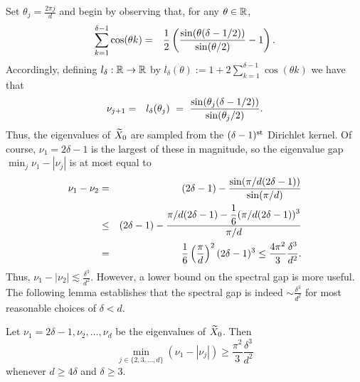 Set $\theta_j = \frac{2 \pi j}{d}$ and begin by observing that, for any $\theta \in \mathbb{R}$,
\begin{eqnarray*}
  \sum_{k = 1}^{\delta - 1}\cos(\theta k) %
  & = & \bigfrac{1}{2}\left(\bigfrac{\sin(\theta(\delta - 1/2))}{\sin(\theta / 2)} - 1\right).
\end{eqnarray*}
Accordingly, defining $l_\delta : \mathbb{R} \to \mathbb{R}$ by $l_\delta(\theta) := 1 + 2\sum_{k=1}^{\delta - 1} \cos(\theta k)$ we have that
\begin{eqnarray}
  \nu_{j+1} %
  & = & l_\delta(\theta_j) ~=~ \bigfrac{\sin(\theta_j(\delta - 1/2))}{\sin(\theta_j / 2)}. \label{equ:EigenFormula}
\end{eqnarray}
Thus, the eigenvalues of $\widetilde{X}_0$ are sampled from the $(\delta-1)^{\rm st}$ Dirichlet kernel.  
Of course, $\nu_1 = 2\delta - 1$ is the largest of these in magnitude, so the eigenvalue gap $\min_j \nu_1 - |\nu_j|$ is at most equal to
\begin{eqnarray*}
  \nu_1 - \nu_2 & = & (2\delta -  1) - \frac{\displaystyle \sin(\pi / d (2\delta - 1))}{\displaystyle \sin(\pi / d)} \\
  & \le & (2 \delta - 1) - \frac{\displaystyle \pi / d(2 \delta - 1) - \frac{1}{6}(\pi / d (2 \delta - 1))^3}{\displaystyle \pi / d} \\
  & = & \frac{1}{6}\left(\frac{\pi}{d}\right)^2(2 \delta - 1)^3 \le \frac{4\pi^2}{3} \frac{\delta^3}{d^2} \label{equ:gap12}.
\end{eqnarray*}
Thus, $\nu_1 - |\nu_2 | \lesssim \frac{\delta^3}{d^2}$.  However, a lower bound on the spectral gap is more useful.  The following lemma establishes that the spectral gap is indeed $\sim \frac{\delta^3}{d^2}$ for most reasonable choices of $\delta < d$.

\begin{lemma}
Let $\nu_1 = 2 \delta -1, \nu_2, \dots, \nu_d$ be the eigenvalues of $\widetilde{X}_0$.  Then
$$\min_{j \in \{2, 3, \dots, d \} } (\nu_1 - |\nu_j| ) \geq \dfrac{\pi^2}{3} \frac{\delta^3}{d^2}$$
whenever $d \geq 4\delta$ and $\delta \geq 3$.
\label{lem:EigGap}
\end{lemma}

